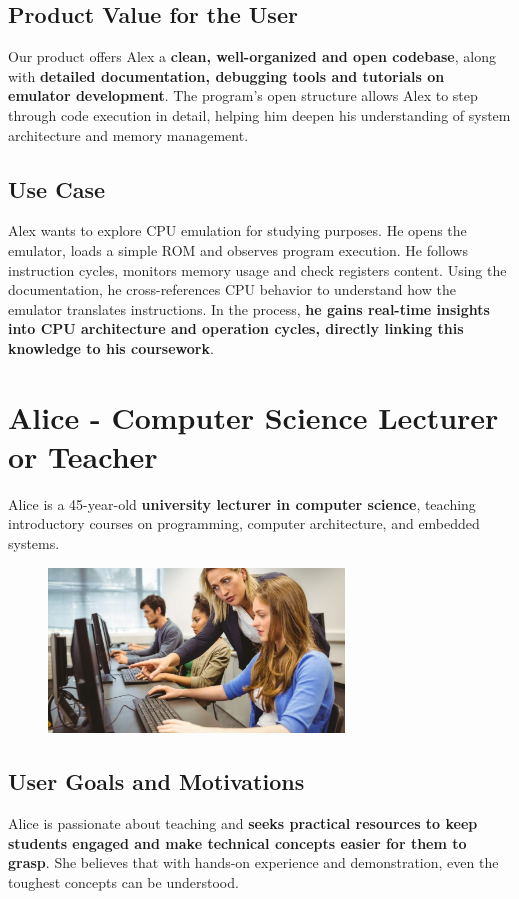 \documentclass[a4paper, 11pt]{article}
\begin{document}
\subsection{Product Value for the User}
Our product offers Alex a \textbf{clean, well-organized and open codebase}, along with \textbf{detailed documentation, debugging tools and tutorials on emulator development}. The program's open structure allows Alex to step through code execution in detail, helping him deepen his understanding of system architecture and memory management.

\subsection{Use Case}
Alex wants to explore CPU emulation for studying purposes. He opens the emulator, loads a simple ROM and observes program execution. He follows instruction cycles, monitors memory usage and check registers content. Using the documentation, he cross-references CPU behavior to understand how the emulator translates instructions. In the process, \textbf{he gains real-time insights into CPU architecture and operation cycles, directly linking this knowledge to his coursework}.

\section{Alice - Computer Science Lecturer or Teacher}
Alice is a 45-year-old \textbf{university lecturer in computer science}, teaching introductory courses on programming, computer architecture, and embedded systems.

\begin{figure}[h]
    \centering
    \includegraphics[width=0.7\textwidth]{teacher.jpg}
\end{figure}

\subsection{User Goals and Motivations}
Alice is passionate about teaching and \textbf{seeks practical resources to keep students engaged and make technical concepts easier for them to grasp}. She believes that with hands-on experience and demonstration, even the toughest concepts can be understood.
\end{document}
